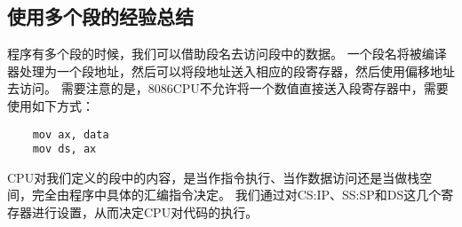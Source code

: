 \documentclass[a4paper,left=2.5cm,right=2.5cm,11pt]{article}
\begin{document}
\subsection{使用多个段的经验总结}
	程序有多个段的时候，我们可以借助段名去访问段中的数据。
	一个段名将被编译器处理为一个段地址，然后可以将段地址送入相应的段寄存器，然后使用偏移地址去访问。
	需要注意的是，8086CPU不允许将一个数值直接送入段寄存器中，需要使用如下方式：
	\begin{lstlisting}
	mov ax, data
	mov ds, ax
	\end{lstlisting}

	CPU对我们定义的段中的内容，是当作指令执行、当作数据访问还是当做栈空间，完全由程序中具体的汇编指令决定。
	我们通过对CS:IP、SS:SP和DS这几个寄存器进行设置，从而决定CPU对代码的执行。
\end{document}
